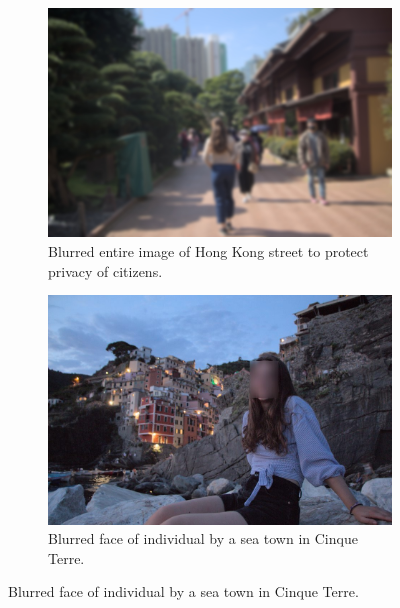 \begin{figure}[H]
    \centering
    \begin{subfigure}{0.46\textwidth}
        \centering
        \includegraphics[width=\textwidth]{Images/Obfuscation/blurred_street.jpg}
        \caption{Blurred entire image of Hong Kong street to protect privacy of citizens.}
    \end{subfigure}
    \hfill
    \begin{subfigure}{0.46\textwidth}
        \centering
        \includegraphics[width=1\textwidth]{Images/Obfuscation/face_blur.jpg}
        \caption{Blurred face of individual by a sea town in Cinque Terre.}
    \end{subfigure}
    \newline


\end{figure}
